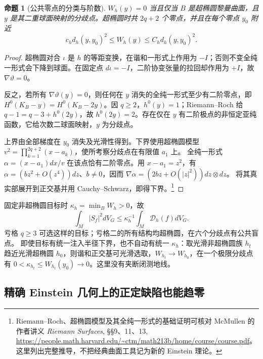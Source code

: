 \documentclass[UTF8,fontset=fandol,zihao=-4,oneside,openany]{ctexbook}
\theoremstyle{cjkplain}
\newtheorem{proposition}[theorem]{命题}
\numberwithin{equation}{chapter}
\begin{document}
\begin{proposition}[公共零点的分类与阶数]\label{SUB:hyperelliptic}
$W_h(y)=0$ 当且仅当 $B$ 是超椭圆黎曼曲面，且 $y$ 是其二重球面映射的分歧点。超椭圆时共 $2q+2$ 个零点，并且在每个零点 $y_0$ 附近
\begin{equation}\label{SUB:quadratic-zero}
c_h d_h(y,y_0)^2\le W_h(y)\le C_h d_h(y,y_0)^2.
\end{equation}
\end{proposition}
\begin{proof}
超椭圆对合 $\iota$ 是 $h$ 的等距变换，在谐和一形式上作用为 $-I$；否则不变全纯一形式会下降到球面。在固定点 $d\iota=-I$，二阶协变张量的拉回却作用为 $+I$，故 $\nabla\vartheta=0$。

反之，若所有 $\nabla\vartheta(y)=0$，则任何在 $y$ 消失的全纯一形式至少有二阶零点，即
$H^0(K_B-y)=H^0(K_B-2y)$。因 $q\ge2$，$h^0(y)=1$；Riemann--Roch 给
$q-1=q-3+h^0(2y)$，故 $h^0(2y)=2$。存在仅在 $y$ 有二阶极点的非恒定亚纯函数，它给次数二球面映射，$y$ 为分歧点。

上界由全部梯度在 $y_0$ 消失及光滑性得到。下界使用超椭圆模型
$v^2=\prod_{k=1}^{2q+2}(x-a_k)$，使所考察分歧点在有限值 $a_1$ 上。
全纯一形式 $\alpha=(x-a_1)dx/v$ 在该点恰有二阶零点。用 $x-a_1=z^2$，有
$\alpha=(bz^2+O(z^4))dz$、$b\ne0$，因而
$\nabla\alpha=(2bz+O(|z|^2))dz\otimes dz$。
将其真实部展开到正交基并用 Cauchy--Schwarz，即得下界。\footnote{Riemann--Roch、超椭圆模型及其全纯一形式的基础证明可核对 McMullen 的作者讲义 \emph{Riemann Surfaces}, §§9、11、13, \url{https://people.math.harvard.edu/~ctm/math213b/home/course/course.pdf}。这里列出完整推导，不把经典曲面工具记为新的 Einstein 理论。}
\end{proof}

固定非超椭圆目标时 $\kappa_h=\min_BW_h>0$，故
\begin{equation}\label{SUB:unweighted-target-test}
\int_M|S_f|^2dV_G\le\kappa_h^{-1}\int_M\mathcal D_h(f)dV_G.
\end{equation}
亏格 $q\ge3$ 可选这样的目标；亏格二的所有结构均超椭圆，在六个分歧点有公共盲点。
即使目标有统一注入半径下界，也不自动有统一 $\kappa_h$：取光滑非超椭圆族 $h_t$ 趋近光滑超椭圆 $h_0$，则谐和正交基可光滑选取，$W_{h_t}\to W_{h_0}$，在一个极限分歧点有
$0<\kappa_{h_t}\le W_{h_t}(y_0)\to0$。这里没有夹断闭测地线。

\subsection{精确 Einstein 几何上的正定缺陷也能趋零}
\end{document}
